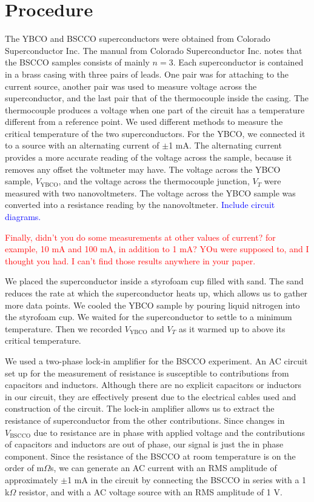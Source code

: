 \documentclass[prb,preprint]{revtex4-1}
\begin{document}
\section{Procedure}
The YBCO and BSCCO superconductors were obtained from Colorado Superconductor Inc. The manual from Colorado Superconductor Inc. notes that the BSCCO samples consists of mainly $n=3$. Each superconductor  is contained in a brass casing with three pairs of leads. 
One pair was for attaching to the current source, another pair was used to measure voltage across the superconductor, and the last pair that of the thermocouple inside the casing. 
The thermocouple produces a voltage when one part of the circuit has a temperature different from a reference point.
We used different methods to measure the critical temperature of the two superconductors. 
For the YBCO, we connected it to a source with an alternating current of $\pm$1 mA. The alternating current provides a more accurate reading of the voltage across the sample, because it removes any offset the voltmeter may have.
The voltage across the YBCO sample, $V_{\text{YBCO}}$, and the voltage across the thermocouple junction, $V_{T}$ were measured with two nanovoltmeters. 
The voltage across the YBCO sample was converted into a resistance reading by the nanovoltmeter.
 \textcolor{blue}{Include circuit diagrams.} 

\textcolor{red}{Finally, didn't you do some measurements at other values of current? for example, 10 mA and 100 mA, in addition to 1 mA? YOu were supposed to, and I thought you had. I can't find those results anywhere in your paper. } 

We placed the superconductor inside a styrofoam cup filled with sand. 
The sand reduces the rate at which the superconductor heats up, which allows us to gather more data points. 
We cooled the YBCO sample by pouring liquid nitrogen into the styrofoam cup. We waited for the superconductor to settle to a minimum temperature. Then we recorded $V_{\text{YBCO}}$ and $V_{T}$ as it warmed up to above its critical temperature. 

We used a two-phase lock-in amplifier for the BSCCO experiment. An AC circuit set up for the measurement of resistance is susceptible to contributions from capacitors and inductors. 
Although there are no explicit capacitors or inductors in our circuit, they are effectively present due to the electrical cables used and construction of the circuit. 
The lock-in amplifier allows us to extract the resistance of superconductor from the other contributions. Since changes in $V_{\text{BSCCO}}$ due to resistance are in phase with applied voltage and the contributions of capacitors and inductors are out of phase, our signal is just the in phase component.  
Since the resistance of the BSCCO at room temperature is on the order of m$\Omega$s, we can generate an AC current with an RMS amplitude of approximately $\pm$1 mA in the circuit by connecting the BSCCO in series with a 1 k$\Omega$ resistor, and with a AC voltage source with an RMS amplitude of 1 V. 
\end{document}
